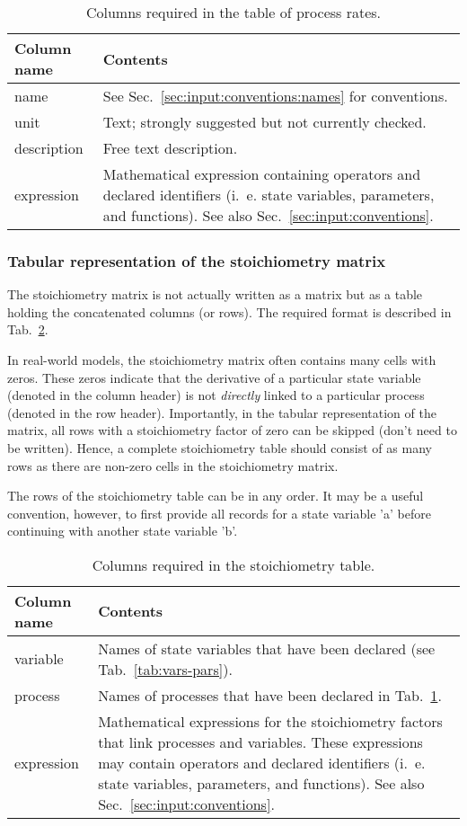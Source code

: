\documentclass[a4paper]{article}
\begin{document}
\begin{table}[!h]
  \caption{Columns required in the table of process rates. \label{tab:processes}}
  \begin{tabular}{lp{}} \hline\hline
    \textbf{Column name} & \textbf{Contents} \\ \hline
    name & See Sec.~\ref{sec:input:conventions:names} for conventions. \\
    unit & Text; strongly suggested but not currently checked. \\
    description & Free text description. \\
    expression & Mathematical expression containing operators and declared identifiers (i.~e. state variables, parameters, and functions). See also Sec.~\ref{sec:input:conventions}. \\
    \hline
  \end{tabular}
\end{table}

\subsubsection{Tabular representation of the stoichiometry matrix} \label{sec:input:tables:stoichiometry}

The stoichiometry matrix is not actually written as a matrix but as a table holding the concatenated columns (or rows). The required format is described in  Tab.~\ref{tab:stoichiometry}.

In real-world models, the stoichiometry matrix often contains many cells with zeros. These zeros indicate that the derivative of a particular state variable (denoted in the column header) is not \emph{directly} linked to a particular process (denoted in the row header). Importantly, in the tabular representation of the matrix, all rows with a stoichiometry factor of zero can be skipped (don't need to be written). Hence, a complete stoichiometry table should consist of as many rows as there are non-zero cells in the stoichiometry matrix.

The rows of the stoichiometry table can be in any order. It may be a useful convention, however, to first provide all records for a state variable 'a' before continuing with another state variable 'b'.

\begin{table}[!h]
  \caption{Columns required in the stoichiometry table. \label{tab:stoichiometry}}
  \begin{tabular}{lp{}} \hline\hline
    \textbf{Column name} & \textbf{Contents} \\ \hline
    variable & Names of state variables that have been declared (see Tab.~\ref{tab:vars-pars}). \\
    process & Names of processes that have been declared in Tab.~\ref{tab:processes}. \\
    expression & Mathematical expressions for the stoichiometry factors that link processes and variables. These expressions may contain operators and declared identifiers (i.~e. state variables, parameters, and functions). See also Sec.~\ref{sec:input:conventions}. \\
    \hline
  \end{tabular}
\end{table}
\end{document}
